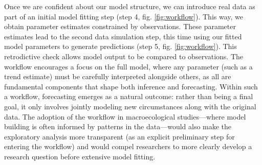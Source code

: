 \documentclass[11pt]{article}
\begin{document}
Once we are confident about our model structure, we can introduce real data as part of an initial model fitting step (step 4, fig. \ref{fig:workflow}). This way, we obtain parameter estimates constrained by observations. 
These parameter estimates lead to the second data simulation step, this time using our fitted model parameters to generate predictions (step 5, fig. \ref{fig:workflow}). This retrodictive check allows model output to be compared to observations. %
The workflow encourages a focus on the full model, where any parameter (such as a trend estimate) must be carefully interpreted alongside others, as all are fundamental components that shape both inference and forecasting. 
Within such a workflow, forecasting emerges as a natural outcome: rather than being a final goal, it only involves jointly modeling new circumstances along with the original data. The adoption of the workflow in macroecological studies---where model building is often informed by patterns in the data---would also make the exploratory analysis more transparent (as an explicit preliminary step for entering the workflow) and would compel researchers to more clearly develop a research question before extensive model fitting. 
\end{document}
